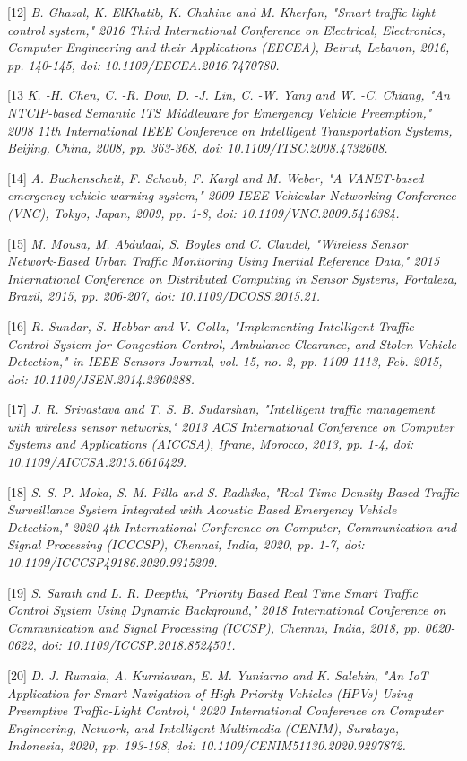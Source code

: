 \documentclass[conference]{IEEEtran}
\begin{document}
[12]\emph{ B. Ghazal, K. ElKhatib, K. Chahine and M. Kherfan, "Smart traffic light control system," 2016 Third International Conference on Electrical, Electronics, Computer Engineering and their Applications (EECEA), Beirut, Lebanon, 2016, pp. 140-145, doi: 10.1109/EECEA.2016.7470780.}

[13\emph{ K. -H. Chen, C. -R. Dow, D. -J. Lin, C. -W. Yang and W. -C. Chiang, "An NTCIP-based Semantic ITS Middleware for Emergency Vehicle Preemption," 2008 11th International IEEE Conference on Intelligent Transportation Systems, Beijing, China, 2008, pp. 363-368, doi: 10.1109/ITSC.2008.4732608. }

[14]\emph{ A. Buchenscheit, F. Schaub, F. Kargl and M. Weber, "A VANET-based emergency vehicle warning system," 2009 IEEE Vehicular Networking Conference (VNC), Tokyo, Japan, 2009, pp. 1-8, doi: 10.1109/VNC.2009.5416384. }


[15]\emph{ M. Mousa, M. Abdulaal, S. Boyles and C. Claudel, "Wireless Sensor Network-Based Urban Traffic Monitoring Using Inertial Reference Data," 2015 International Conference on Distributed Computing in Sensor Systems, Fortaleza, Brazil, 2015, pp. 206-207, doi: 10.1109/DCOSS.2015.21. }


[16]\emph{ R. Sundar, S. Hebbar and V. Golla, "Implementing Intelligent Traffic Control System for Congestion Control, Ambulance Clearance, and Stolen Vehicle Detection," in IEEE Sensors Journal, vol. 15, no. 2, pp. 1109-1113, Feb. 2015, doi: 10.1109/JSEN.2014.2360288. }


[17]\emph{ J. R. Srivastava and T. S. B. Sudarshan, "Intelligent traffic management with wireless sensor networks," 2013 ACS International Conference on Computer Systems and Applications (AICCSA), Ifrane, Morocco, 2013, pp. 1-4, doi: 10.1109/AICCSA.2013.6616429.}


[18]\emph{ S. S. P. Moka, S. M. Pilla and S. Radhika, "Real Time Density Based Traffic Surveillance System Integrated with Acoustic Based Emergency Vehicle Detection," 2020 4th International Conference on Computer, Communication and Signal Processing (ICCCSP), Chennai, India, 2020, pp. 1-7, doi: 10.1109/ICCCSP49186.2020.9315209. }


[19]\emph{ S. Sarath and L. R. Deepthi, "Priority Based Real Time Smart Traffic Control System Using Dynamic Background," 2018 International Conference on Communication and Signal Processing (ICCSP), Chennai, India, 2018, pp. 0620-0622, doi: 10.1109/ICCSP.2018.8524501. }


[20] \emph{ D. J. Rumala, A. Kurniawan, E. M. Yuniarno and K. Salehin, "An IoT Application for Smart Navigation of High Priority Vehicles (HPVs) Using Preemptive Traffic-Light Control," 2020 International Conference on Computer Engineering, Network, and Intelligent Multimedia (CENIM), Surabaya, Indonesia, 2020, pp. 193-198, doi: 10.1109/CENIM51130.2020.9297872. }
\end{document}
